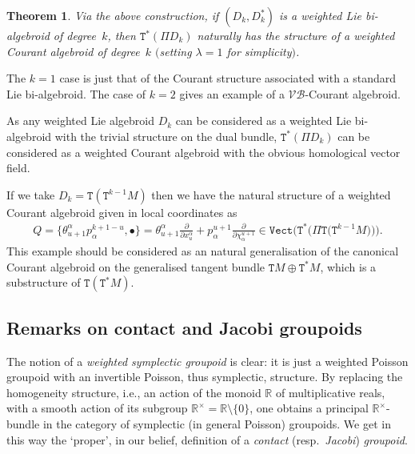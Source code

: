 \documentclass[pdftex]{sigma}
\def\Vect{\mathtt{Vect}}
\def\sT{{\mathtt T}}
\numberwithin{equation}{section}
\newtheorem{Theorem}{Theorem}[section]
\begin{document}
\begin{Theorem}
Via the above construction, if $(D_{k},D_{k}^{*})$ is a weighted Lie bi-algebroid of deg\-ree~$k$, then $\sT^{*}(\Pi D_{k})$ naturally has the structure of a weighted Courant algebroid of degree~$k$ $($setting $\lambda =1$ for simplicity$)$.
\end{Theorem}

\begin{Example}
The $k=1$ case is just that of the  Courant structure associated with a standard Lie bi-algebroid. The case of $k=2$ gives an example of a   $\mathcal{VB}$-Courant algebroid.
\end{Example}


\begin{Example}
As any weighted Lie algebroid $D_{k}$ can be considered as a weighted Lie bi-algebroid with the trivial structure on the dual bundle, $\sT^{*}(\Pi D_{k})$ can be considered as a weighted Courant algebroid with the obvious homological vector f\/ield.
\end{Example}

\begin{Example}
If we take $D_{k} = \sT(\sT^{k-1}M)$ then we have the natural structure of a weighted Courant algebroid given in local coordinates as
\begin{gather*}
Q =  \big\{ \theta_{u+1}^{\alpha} p_{\alpha}^{k+1-u}, \bullet \big\}= \theta_{u+1}^{\alpha}\frac{\partial}{\partial x^{\alpha}_{u} }  +   p_{\alpha}^{u+1}\frac{\partial }{\partial \chi_{\alpha}^{u+1} }  \in \Vect\big(\sT^{*}\big(\Pi \sT \big(\sT^{k-1} M\big)\big)\big).
\end{gather*}
  This example should be considered as an natural generalisation of the canonical Courant algebroid on the generalised tangent bundle $\sT M \oplus \sT^{*}M$, which is a substructure of $\sT(\sT^{*}M)$.
\end{Example}


\subsection{Remarks on contact and Jacobi groupoids}

The notion of a \emph{weighted symplectic groupoid} is clear: it is just a weighted Poisson groupoid with an invertible Poisson, thus symplectic, structure.
By replacing  the homogeneity structure, i.e., an action of the monoid ${\mathbb R}$ of multiplicative reals, with a smooth action of its subgroup $\mathbb{R}^{\times}={\mathbb R}{\setminus}\{ 0\}$, one obtains a principal $\mathbb{R}^{\times}$-bundle in the category of symplectic (in general Poisson)  groupoids. We get in this way the `proper', in our belief, def\/inition of a \emph{contact} (resp.\ \emph{Jacobi}) \emph{groupoid}.
\end{document}
